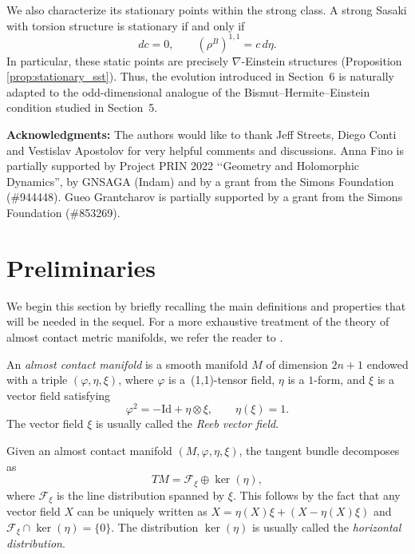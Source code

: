 \documentclass{article}
\theoremstyle{definition}
\renewcommand{\phi}{\varphi}
\numberwithin{equation}{section}
\begin{document}
\medskip 
We also characterize its stationary points within the strong class. A strong Sasaki with torsion structure is stationary if and only if
\[
dc=0,
\qquad
(\rho^B)^{1,1}=c\,d\eta.
\]
In particular, these static points are precisely $\nabla$-Einstein structures (Proposition \ref{prop:stationary_sst}). Thus, the evolution introduced in Section~6 is naturally adapted to the odd-dimensional analogue of the Bismut--Hermite--Einstein condition studied in Section~5.
\noindent 
\newline 

\smallskip

{\bf Acknowledgments:} The authors would like to thank Jeff Streets,  Diego Conti  and Vestislav Apostolov for very helpful comments and discussions.
 Anna Fino is partially supported by Project PRIN 2022 \lq \lq Geometry and Holomorphic Dynamics”, by GNSAGA (Indam) and by a grant from the Simons Foundation (\#944448).  Gueo Grantcharov is partially supported by a grant from the Simons Foundation (\#853269). 




\section{Preliminaries}\label{Sec:pre}
We begin this section by briefly recalling the main definitions and properties that will be needed in the sequel. 
For a more exhaustive treatment of the theory of almost contact metric manifolds, we refer the reader to \cite{Bl,BG}.

\medskip

An \emph{almost contact manifold} is a smooth manifold \(M\) of dimension \(2n+1\) endowed with a triple 
\((\phi, \eta, \xi)\), where \(\phi\) is a \,(1,1)-tensor field, \(\eta\) is a \(1\)-form, and \(\xi\) is a vector field satisfying
\begin{equation} \label{eqn:phisquare}
    \phi^2 = -\mathrm{Id} + \eta \otimes \xi, 
    \qquad 
    \eta(\xi) = 1.
\end{equation}
The vector field \(\xi\) is usually called the \emph{Reeb vector field}. \par
Given an almost contact manifold \((M, \phi, \eta, \xi)\), the tangent bundle decomposes as
\begin{equation} \label{eqn:splitting}
    TM = \mathcal{F}_\xi \oplus \ker(\eta),
\end{equation}
where \(\mathcal{F}_\xi\) is the line distribution spanned by \(\xi\). This follows by the fact that any vector field $X$ can be uniquely written as $X=\eta(X) \xi + (X -\eta(X) \xi)$ and $\mathcal{F}_\xi \cap\ker(\eta)=\{0\}$. The distribution \(\ker(\eta)\) is usually called the \emph{horizontal distribution}. \par
\end{document}
